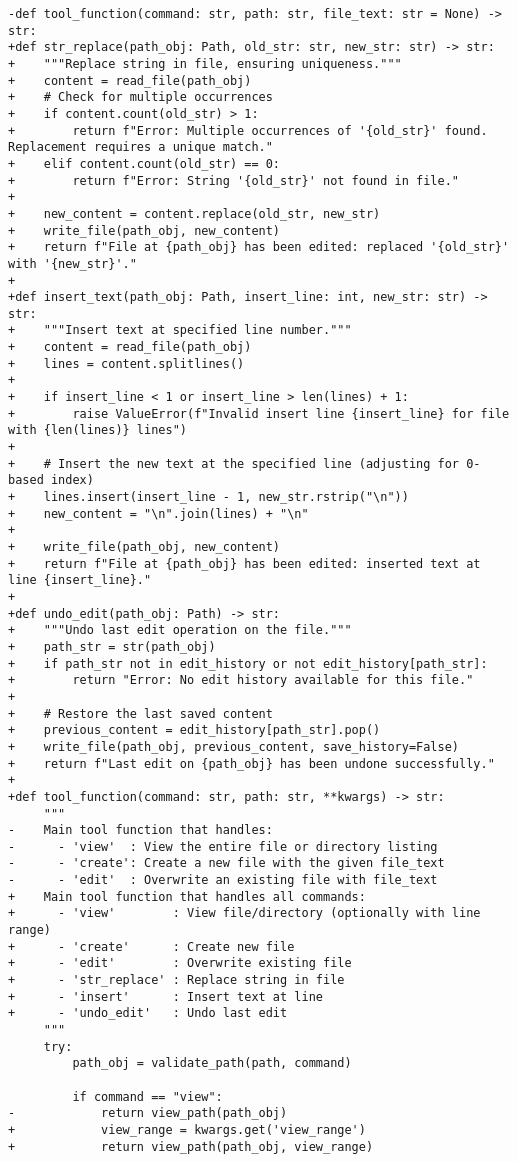 \begin{lstlisting}[style=diffstyle]
-def tool_function(command: str, path: str, file_text: str = None) -> str:
+def str_replace(path_obj: Path, old_str: str, new_str: str) -> str:
+    """Replace string in file, ensuring uniqueness."""
+    content = read_file(path_obj)
+    # Check for multiple occurrences
+    if content.count(old_str) > 1:
+        return f"Error: Multiple occurrences of '{old_str}' found. Replacement requires a unique match."
+    elif content.count(old_str) == 0:
+        return f"Error: String '{old_str}' not found in file."
+
+    new_content = content.replace(old_str, new_str)
+    write_file(path_obj, new_content)
+    return f"File at {path_obj} has been edited: replaced '{old_str}' with '{new_str}'."
+
+def insert_text(path_obj: Path, insert_line: int, new_str: str) -> str:
+    """Insert text at specified line number."""
+    content = read_file(path_obj)
+    lines = content.splitlines()
+
+    if insert_line < 1 or insert_line > len(lines) + 1:
+        raise ValueError(f"Invalid insert line {insert_line} for file with {len(lines)} lines")
+
+    # Insert the new text at the specified line (adjusting for 0-based index)
+    lines.insert(insert_line - 1, new_str.rstrip("\n"))
+    new_content = "\n".join(lines) + "\n"
+    
+    write_file(path_obj, new_content)
+    return f"File at {path_obj} has been edited: inserted text at line {insert_line}."
+
+def undo_edit(path_obj: Path) -> str:
+    """Undo last edit operation on the file."""
+    path_str = str(path_obj)
+    if path_str not in edit_history or not edit_history[path_str]:
+        return "Error: No edit history available for this file."
+
+    # Restore the last saved content
+    previous_content = edit_history[path_str].pop()
+    write_file(path_obj, previous_content, save_history=False)
+    return f"Last edit on {path_obj} has been undone successfully."
+
+def tool_function(command: str, path: str, **kwargs) -> str:
     """
-    Main tool function that handles:
-      - 'view'  : View the entire file or directory listing
-      - 'create': Create a new file with the given file_text
-      - 'edit'  : Overwrite an existing file with file_text
+    Main tool function that handles all commands:
+      - 'view'        : View file/directory (optionally with line range)
+      - 'create'      : Create new file
+      - 'edit'        : Overwrite existing file
+      - 'str_replace' : Replace string in file
+      - 'insert'      : Insert text at line
+      - 'undo_edit'   : Undo last edit
     """
     try:
         path_obj = validate_path(path, command)
 
         if command == "view":
-            return view_path(path_obj)
+            view_range = kwargs.get('view_range')
+            return view_path(path_obj, view_range)
 

\end{lstlisting}

